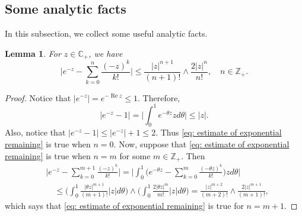 \documentclass[UTF8]{pkuthss}
\theoremstyle{plain}
\newtheorem{lem}[thm]{Lemma}
\theoremstyle{definition}
\numberwithin{equation}{section}
\begin{document}
\subsection{Some analytic facts}
    In this subsection, we collect some useful analytic facts.
\begin{lem}
\label{lem: estimate of exponential remaining}
    For $z\in \mathbb C_+$,  we have
\begin{equation}
\label{eq: estimate of exponential remaining}
    \Big|e^{-z} - \sum_{k=0}^n \frac{(-z)^k}{k!} \Big|
    \leq \frac{|z|^{n+1}}{(n+1)!} \wedge \frac{2|z|^{n}}{n!}, \quad n\in \mathbb Z_+.
\end{equation}
\end{lem}
\begin{proof}
    Notice that $|e^{-z}| = e^{- \operatorname{Re} z} \leq 1$.
    Therefore,
\begin{equation}
    |e^{-z} - 1|
    = \Big| \int_0^1 e^{-\theta z} z d\theta\Big|
    \leq |z|.
\end{equation}
    Also, notice that $|e^{-z} - 1| \leq |e^{-z}|+1 \leq 2$.
    Thus \eqref{eq: estimate of exponential remaining} is true when $n = 0$.
    Now, suppose that \eqref{eq: estimate of exponential remaining} is true when $n = m$ for some $m \in \mathbb Z_+$.
    Then
\begin{align}
    &\Big|e^{-z} - \sum_{k=0}^{m+1} \frac{(-z)^k}{k!}\Big|
    = \Big| \int_0^1\Big(e^{-\theta z} - \sum_{k=0}^m \frac{(-\theta z)^k}{k!} \Big) z d\theta \Big|
    \\&\quad \leq  \Big(\int_0^1 \frac{|\theta z|^{m+1}}{(m+1)!} |z| d\theta\Big) \wedge \Big(\int_0^1 \frac{2|\theta z|^{m}}{m!} |z| d\theta\Big)
    = \frac{|z|^{m+2}}{(m+2)!} \wedge \frac{2|z|^{m+1}}{(m+1)!},
\end{align}
    which says that \eqref{eq: estimate of exponential remaining} is true for $n = m + 1$.
\end{proof}
\end{document}
